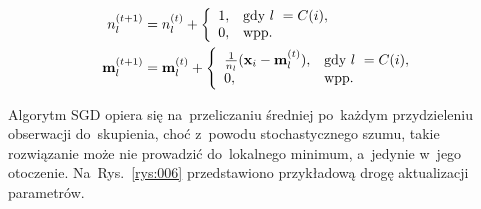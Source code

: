 \documentclass{praca1}
\begin{document}
\begin{align}
n^{(t+1)}_l& = n^{(t)}_l + \left\{
\begin{array}{l l}     
    1, & \text{gdy } l~= C(i), \\
    0, & \text{wpp.}
\end{array}\right. \\
\mathbf{m}_l^{(t+1)}& = \mathbf{m}_l^{(t)} + \left\{
\begin{array}{l l}     
    \frac{1}{n_l}(\mathbf{x}_i - \mathbf{m}^{(t)}_l), & \text{gdy } l~= C(i), \\
    0, & \text{wpp.}
\end{array}\right.
\end{align}


Algorytm SGD opiera się na~przeliczaniu średniej po~każdym przydzieleniu obserwacji do~skupienia, choć z~powodu stochastycznego szumu, takie rozwiązanie może nie prowadzić do~lokalnego minimum, a~jedynie w~jego otoczenie. Na~Rys.~\ref{rys:006} przedstawiono przykładową drogę aktualizacji parametrów. 
\end{document}
